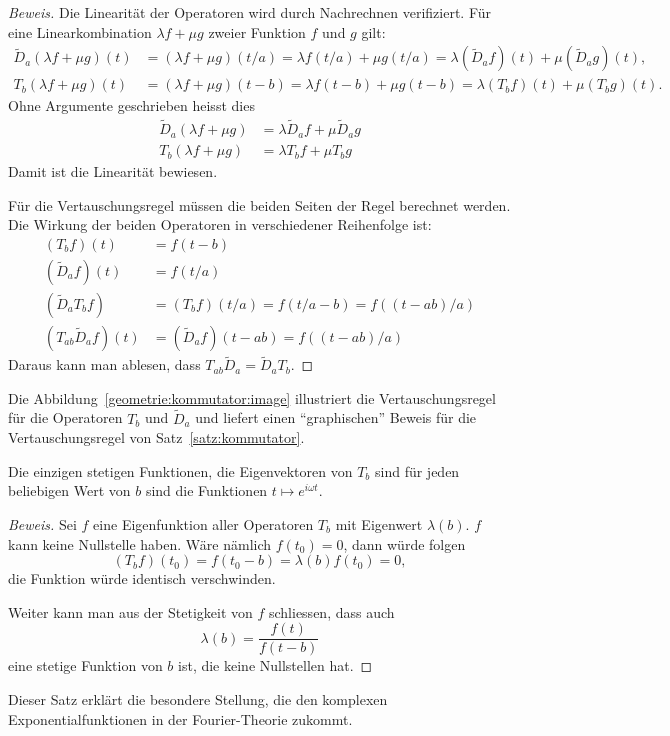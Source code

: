 \begin{proof}[Beweis]
Die Linearität der Operatoren wird durch Nachrechnen verifiziert.
Für eine Linearkombination $\lambda f+\mu g$ zweier Funktion $f$ und $g$ gilt:
\begin{align*}
\tilde{D}_a(\lambda f+\mu g)(t)
&=
(\lambda f+\mu g)(t/a)
=
\lambda f(t/a)+\mu g(t/a)
=
\lambda (\tilde{D}_af)(t)+\mu (\tilde{D}_ag)(t),
\\
T_b(\lambda f+ \mu g)(t)
&=
(\lambda f+\mu g)(t-b)
=
\lambda f(t-b)+\mu g(t-b)
=
\lambda (T_bf)(t)+\mu (T_bg)(t).
\end{align*}
Ohne Argumente geschrieben heisst dies
\begin{align*}
\tilde{D}_a(\lambda f+\mu g) &= \lambda \tilde{D}_af + \mu \tilde{D}_ag
\\
T_b(\lambda f+\mu g) &= \lambda T_bf + \mu T_bg
\end{align*}
Damit ist die Linearität bewiesen.

Für die Vertauschungsregel müssen die beiden Seiten der Regel
berechnet werden.
Die Wirkung der beiden Operatoren in verschiedener Reihenfolge
ist:
\begin{align*}
(T_bf)(t)
&=
f(t-b)
\\
(\tilde{D}_af)(t)
&=
f(t/a)
\\
(\tilde{D}_aT_bf)
&=
(T_bf)(t/a)
=
f(t/a-b)
=
f((t-ab)/a)
\\
(T_{ab}\tilde{D}_a f)(t)
&=
(\tilde{D}_af)(t - ab)
=
f((t-ab)/a)
\end{align*}
Daraus kann man ablesen, dass $T_{ab}\tilde{D}_a=\tilde{D}_aT_b$.
\end{proof}

Die Abbildung~\ref{geometrie:kommutator:image} illustriert die
Vertauschungsregel für die Operatoren $T_b$ und $\tilde{D}_a$ und liefert
einen ``graphischen'' Beweis für die Vertauschungsregel von
Satz~\ref{satz:kommutator}.

\begin{satz}
Die einzigen stetigen Funktionen, die Eigenvektoren von $T_b$ sind für
jeden beliebigen Wert von $b$ sind die Funktionen $t\mapsto e^{i\omega t}$.
\end{satz}

\begin{proof}[Beweis]
Sei $f$ eine Eigenfunktion aller Operatoren $T_b$ mit Eigenwert $\lambda(b)$.
$f$ kann keine Nullstelle haben.
Wäre nämlich $f(t_0)=0$, dann würde folgen
\[
(T_bf)(t_0) = f(t_0-b) = \lambda(b) f(t_0) = 0,
\]
die Funktion würde identisch verschwinden.

Weiter kann man aus der Stetigkeit von $f$ schliessen, dass auch
\[
\lambda(b) = \frac{f(t)}{f(t-b)}
\]
eine stetige Funktion von $b$ ist, die keine Nullstellen hat.
\end{proof}

Dieser Satz erklärt die besondere Stellung, die den komplexen
Exponentialfunktionen in der Fourier-Theorie zukommt.
